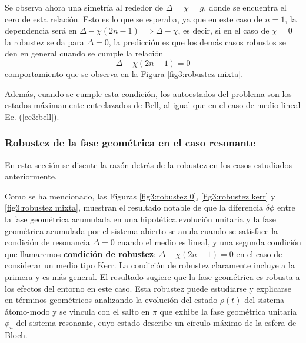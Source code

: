 Se observa ahora una simetría al rededor de $\Delta=\chi=g$, donde se encuentra el cero de esta relación. Esto es lo que se esperaba, ya que en este caso de $n=1$, la dependencia será en $\Delta-\chi(2n-1) \implies \Delta-\chi$, es decir, si en el caso de $\chi=0$ la robustez se da para $\Delta=0$, la predicción es que los demás casos robustos se den en general cuando se cumple la relación 
\begin{equation}\label{ec3:condicion robuestez 1 atomo}
        \Delta-\chi(2n-1)=0
\end{equation}
comportamiento que se observa en la Figura \ref{fig3:robustez mixta}. 

Además, cuando se cumple esta condición, los autoestados del problema son los estados máximamente entrelazados de Bell, al igual que en el caso de medio lineal Ec. (\ref{ec3:bell}).
\subsubsection{Robustez de la fase geométrica en el caso resonante}

En esta sección se discute la razón detrás de la robustez en los casos estudiados anteriormente. 

Como se ha mencionado, las Figuras \ref{fig3:robustez 0}, \ref{fig3:robustez kerr} y \ref{fig3:robustez mixta}, muestran el resultado notable de que la diferencia $\delta\phi$ entre la fase geométrica acumulada en una hipotética evolución unitaria y la fase geométrica acumulada por el sistema abierto se anula cuando se satisface la condición de resonancia $\Delta = 0$ cuando el medio es lineal, y una segunda condición que llamaremos \textbf{condición de robustez}: $\Delta-\chi(2n-1)=0$ en el caso de considerar un medio tipo Kerr. La condición de robustez claramente incluye a la primera y es más general. El resultado sugiere que la fase geométrica es robusta a los efectos del entorno en este caso. Esta robustez puede estudiarse y explicarse en términos geométricos analizando la evolución del estado $\rho(t)$ del sistema átomo-modo y se vincula con el salto en $\pi$ que exhibe la fase geométrica unitaria $\phi_u$ del sistema resonante, cuyo estado describe un círculo máximo de la esfera de Bloch.

